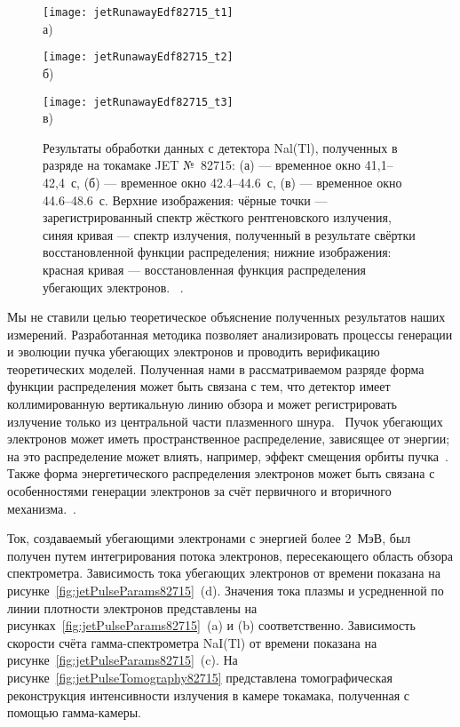 \begin{figure}[ht]
    \begin{minipage}[b][][b]{0.42\linewidth}\centering
        \texttt{[image: jetRunawayEdf82715\_t1]} \\ а)
    \end{minipage}
    \hfill
    \begin{minipage}[b][][b]{0.42\linewidth}\centering
        \texttt{[image: jetRunawayEdf82715\_t2]} \\ б)
    \end{minipage}
    \hfill
    \begin{minipage}[b][][b]{0.42\linewidth}\centering
        \texttt{[image: jetRunawayEdf82715\_t3]} \\ в)
    \end{minipage}
    \caption{ Результаты обработки данных с детектора Nal(Tl), полученных в разряде на токамаке JET №~82715: (а) --- временное окно 41,1--42,4~с, (б) --- временное окно 42.4--44.6~с, (в) --- временное окно 44.6--48.6~с. Верхние изображения: чёрные точки --- зарегистрированный спектр жёсткого рентгеновского излучения, синяя кривая --- спектр излучения, полученный в результате свёртки восстановленной функции распределения; нижние изображения: красная кривая --- восстановленная функция распределения убегающих электронов. ~\cite{Shevelev2013}. }
    \label{fig:jetRunawayEdf82715}
\end{figure}


Мы не ставили целью теоретическое объяснение полученных результатов наших измерений. Разработанная методика позволяет анализировать процессы генерации и эволюции пучка убегающих электронов и проводить верификацию теоретических моделей. Полученная нами в рассматриваемом разряде форма функции распределения может быть связана с тем, что детектор имеет коллимированную вертикальную линию обзора и может регистрировать излучение только из центральной части плазменного шнура.~\cite{Shevelev2013} Пучок убегающих электронов может иметь пространственное распределение, зависящее от энергии; на это распределение может влиять, например, эффект смещения орбиты пучка~\cite{Knoepfel1979}. Также форма энергетического распределения электронов может быть связана с особенностями генерации электронов за счёт первичного и вторичного механизма.~\cite{Helander2002}.

Ток, создаваемый убегающими электронами с энергией более 2~МэВ, был получен путем интегрирования потока электронов, пересекающего область обзора спектрометра. Зависимость тока убегающих электронов от времени показана на рисунке~\ref{fig:jetPulseParams82715}~(d). Значения тока плазмы и усредненной по линии плотности электронов представлены на рисунках~\ref{fig:jetPulseParams82715}~(a) и (b) соответственно. Зависимость скорости счёта гамма-спектрометра NaI(Tl) от времени показана на рисунке~\ref{fig:jetPulseParams82715}~(c). На рисунке~\ref{fig:jetPulseTomography82715} представлена томографическая реконструкция интенсивности излучения в камере токамака, полученная с помощью гамма-камеры.


